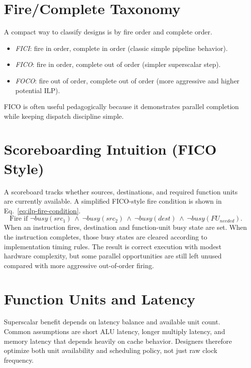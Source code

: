 \section{Fire/Complete Taxonomy}\label{sec:ilp-fire-complete}
A compact way to classify designs is by fire order and complete order.
\begin{itemize}
\item \textit{FICI}: fire in order, complete in order (classic simple pipeline behavior).
\item \textit{FICO}: fire in order, complete out of order (simpler superscalar step).
\item \textit{FOCO}: fire out of order, complete out of order (more aggressive and higher potential ILP).
\end{itemize}
FICO is often useful pedagogically because it demonstrates parallel completion while keeping dispatch discipline simple.

\section{Scoreboarding Intuition (FICO Style)}\label{sec:ilp-scoreboard}
A scoreboard tracks whether sources, destinations, and required function units are currently available.
A simplified FICO-style fire condition is shown in Eq.~\eqref{eq:ilp-fire-condition}.
\begin{equation}\label{eq:ilp-fire-condition}
\text{Fire if }\neg busy(src_1)\ \wedge\ \neg busy(src_2)\ \wedge\ \neg busy(dest)\ \wedge\ \neg busy(FU_{needed}).
\end{equation}
When an instruction fires, destination and function-unit busy state are set.
When the instruction completes, those busy states are cleared according to implementation timing rules.
The result is correct execution with modest hardware complexity, but some parallel opportunities are still left unused compared with more aggressive out-of-order firing.

\section{Function Units and Latency}\label{sec:ilp-latency}
Superscalar benefit depends on latency balance and available unit count.
Common assumptions are short ALU latency, longer multiply latency, and memory latency that depends heavily on cache behavior.
Designers therefore optimize both unit availability and scheduling policy, not just raw clock frequency.

